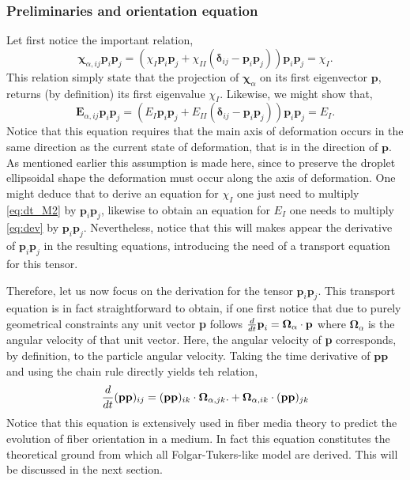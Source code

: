 \subsubsection{Preliminaries and orientation equation}
Let first notice the important relation,
\begin{equation}
    \bm\chi_{\alpha,ij} \textbf{p}_i\textbf{p}_j
    = 
    (
        \chi_I \textbf{p}_i\textbf{p}_j
        + \chi_{II} (\bm\delta_{ij} - \textbf{p}_i\textbf{p}_j)
    ) \textbf{p}_i\textbf{p}_j
    = \chi_I.
    \label{eq:chi_I_def}
\end{equation} 
This relation simply state that the projection of $\bm\chi_\alpha$ on its first eigenvector $\textbf{p}$, returns (by definition) its first eigenvalue $\chi_I$. 
Likewise, we might show that, 
\begin{equation}
    \textbf{E}_{\alpha,ij} \textbf{p}_i\textbf{p}_j
    = 
    (
        E_I \textbf{p}_i\textbf{p}_j
        + E_{II} (\bm\delta_{ij} - \textbf{p}_i\textbf{p}_j)
    ) \textbf{p}_i\textbf{p}_j
    = E_I.
    \label{eq:E_I_def}
\end{equation} 
Notice that this equation requires that the main axis of deformation occurs in the same direction as the current state of deformation, that is in the direction of $\textbf{p}$. 
As mentioned earlier this assumption is made here, since to preserve the droplet ellipsoidal shape the deformation must occur along the axis of deformation. 
One might deduce that to derive an equation for $\chi_I$ one just need to multiply \ref{eq:dt_M2} by $\textbf{p}_i \textbf{p}_j$, likewise to obtain an equation for $E_I$ one needs to multiply \ref{eq:dev} by $\textbf{p}_i \textbf{p}_j$. 
Nevertheless, notice that this will makes appear the derivative of $\textbf{p}_i \textbf{p}_j$ in the resulting equations, introducing the need of a transport equation for this tensor. 

Therefore, let us now focus on the derivation for the tensor  $\textbf{p}_i \textbf{p}_j$. 
This transport equation is in fact straightforward to obtain, if one first notice that due to purely geometrical constraints any unit vector \textbf{p} follows $\frac{d}{dt} \textbf{p}_i = \bm\Omega_\alpha \cdot \textbf{p}$ where $\bm\Omega_\alpha$ is the angular velocity of that unit vector.
Here, the angular velocity of \textbf{p} corresponds, by definition, to the particle angular velocity. 
Taking the time derivative of $\textbf{pp}$ and using the chain rule directly yields teh relation, 
\begin{equation}
    \frac{d}{dt} (\textbf{pp})_{ij}
    = 
    (\textbf{pp})_{ik}\cdot\bm\Omega_{\alpha,jk}. 
    +\bm\Omega_{\alpha,ik}\cdot (\textbf{pp})_{jk}
    \label{eq:dt_pp}
\end{equation}
Notice that this equation is extensively used in fiber media theory to predict the evolution of fiber orientation in a medium. 
In fact this equation constitutes the theoretical ground from which all Folgar-Tukers-like model are derived. 
This will be discussed in the next section.

